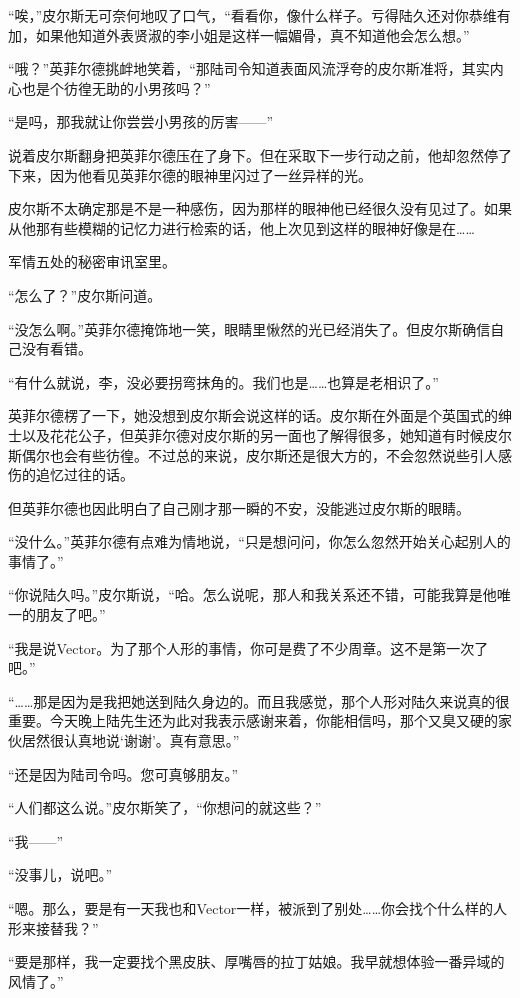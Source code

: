 “唉，”皮尔斯无可奈何地叹了口气，“看看你，像什么样子。亏得陆久还对你恭维有加，如果他知道外表贤淑的李小姐是这样一幅媚骨，真不知道他会怎么想。”

“哦？”英菲尔德挑衅地笑着，“那陆司令知道表面风流浮夸的皮尔斯准将，其实内心也是个彷徨无助的小男孩吗？”

“是吗，那我就让你尝尝小男孩的厉害——”

说着皮尔斯翻身把英菲尔德压在了身下。但在采取下一步行动之前，他却忽然停了下来，因为他看见英菲尔德的眼神里闪过了一丝异样的光。

皮尔斯不太确定那是不是一种感伤，因为那样的眼神他已经很久没有见过了。如果从他那有些模糊的记忆力进行检索的话，他上次见到这样的眼神好像是在……

军情五处的秘密审讯室里。

“怎么了？”皮尔斯问道。

“没怎么啊。”英菲尔德掩饰地一笑，眼睛里愀然的光已经消失了。但皮尔斯确信自己没有看错。

“有什么就说，李，没必要拐弯抹角的。我们也是……也算是老相识了。”

英菲尔德楞了一下，她没想到皮尔斯会说这样的话。皮尔斯在外面是个英国式的绅士以及花花公子，但英菲尔德对皮尔斯的另一面也了解得很多，她知道有时候皮尔斯偶尔也会有些彷徨。不过总的来说，皮尔斯还是很大方的，不会忽然说些引人感伤的追忆过往的话。

但英菲尔德也因此明白了自己刚才那一瞬的不安，没能逃过皮尔斯的眼睛。

“没什么。”英菲尔德有点难为情地说，“只是想问问，你怎么忽然开始关心起别人的事情了。”

“你说陆久吗。”皮尔斯说，“哈。怎么说呢，那人和我关系还不错，可能我算是他唯一的朋友了吧。”

“我是说Vector。为了那个人形的事情，你可是费了不少周章。这不是第一次了吧。”

“……那是因为是我把她送到陆久身边的。而且我感觉，那个人形对陆久来说真的很重要。今天晚上陆先生还为此对我表示感谢来着，你能相信吗，那个又臭又硬的家伙居然很认真地说‘谢谢’。真有意思。”

“还是因为陆司令吗。您可真够朋友。”

“人们都这么说。”皮尔斯笑了，“你想问的就这些？”

“我——”

“没事儿，说吧。”

“嗯。那么，要是有一天我也和Vector一样，被派到了别处……你会找个什么样的人形来接替我？”

“要是那样，我一定要找个黑皮肤、厚嘴唇的拉丁姑娘。我早就想体验一番异域的风情了。”

